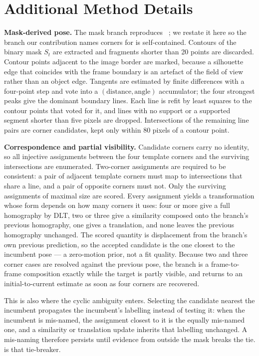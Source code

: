 \appendix

\section{Additional Method Details}
\label{sec:supp-method}

\noindent\textbf{Mask-derived pose.}
The mask branch reproduces \samh~\cite{serych2026woftsam}; we restate it here so the branch our contribution names corners for is self-contained.
Contours of the binary mask $S_t$ are extracted and fragments shorter than 20 points are discarded.
Contour points adjacent to the image border are marked, because a silhouette edge that coincides with the frame boundary is an artefact of the field of view rather than an object edge.
Tangents are estimated by finite differences with a four-point step and vote into a $(\text{distance},\text{angle})$ accumulator; the four strongest peaks give the dominant boundary lines.
Each line is refit by least squares to the contour points that voted for it, and lines with no support or a supported segment shorter than five pixels are dropped.
Intersections of the remaining line pairs are corner candidates, kept only within 80 pixels of a contour point.

\noindent\textbf{Correspondence and partial visibility.}
Candidate corners carry no identity, so all injective assignments between the four template corners and the surviving intersections are enumerated.
Two-corner assignments are required to be consistent: a pair of adjacent template corners must map to intersections that share a line, and a pair of opposite corners must not.
Only the surviving assignments of maximal size are scored.
Every assignment yields a transformation whose form depends on how many corners it uses: four or more give a full homography by DLT, two or three give a similarity composed onto the branch's previous homography, one gives a translation, and none leaves the previous homography unchanged.
The scored quantity is displacement from the branch's own previous prediction, so the accepted candidate is the one closest to the incumbent pose --- a zero-motion prior, not a fit quality.
Because two and three corner cases are resolved against the previous pose, the branch is a frame-to-frame composition exactly while the target is partly visible, and returns to an initial-to-current estimate as soon as four corners are recovered.

This is also where the cyclic ambiguity enters.
Selecting the candidate nearest the incumbent propagates the incumbent's labelling instead of testing it: when the incumbent is mis-named, the assignment closest to it is the equally mis-named one, and a similarity or translation update inherits that labelling unchanged.
A mis-naming therefore persists until evidence from outside the mask breaks the tie.
 is that tie-breaker.

